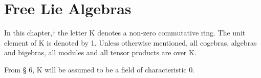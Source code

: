 \chapter{Free Lie Algebras}

In this chapter,† the letter K denotes a non-zero commutative ring. The unit element of K is denoted by 1. Unless otherwise mentioned, all cogebras, algebras and bigebras, all modules and all tensor products are over K.

From § 6, K will be assumed to be a field of characteristic 0.

